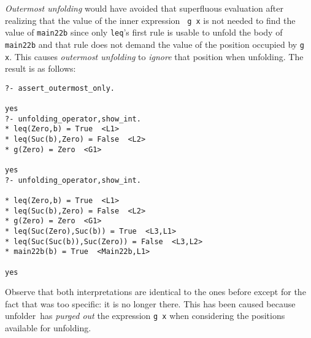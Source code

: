 \documentclass[11pt,a4paper,twoside,openright]{book}
\newcommand{\unfolder}{{\textsf{unfolder~}}}
\begin{document}
{\em Outermost unfolding} would have avoided that superfluous
evaluation after realizing that the value of the inner expression {\tt
  g x} is not needed to find the value of {\tt main22b} since only
{\tt leq}'s first rule is usable to unfold the body of {\tt main22b}
and that rule does not demand the value of the position occupied by
{\tt g x}. This causes {\em outermost unfolding} to {\em ignore} that
position when unfolding. The result is as follows:

\begin{verbatim}
?- assert_outermost_only.

yes
?- unfolding_operator,show_int.           
* leq(Zero,b) = True  <L1>
* leq(Suc(b),Zero) = False  <L2>
* g(Zero) = Zero  <G1>

yes
?- unfolding_operator,show_int.

* leq(Zero,b) = True  <L1>
* leq(Suc(b),Zero) = False  <L2>
* g(Zero) = Zero  <G1>
* leq(Suc(Zero),Suc(b)) = True  <L3,L1>
* leq(Suc(Suc(b)),Suc(Zero)) = False  <L3,L2>
* main22b(b) = True  <Main22b,L1>

yes
\end{verbatim}

\noindent
Observe that both interpretations are identical to the ones before
except for the fact that was too specific: it is no longer there. This
has been caused because \unfolder has {\em purged out} the expression
{\tt g x} when considering the positions available for unfolding.
\end{document}
